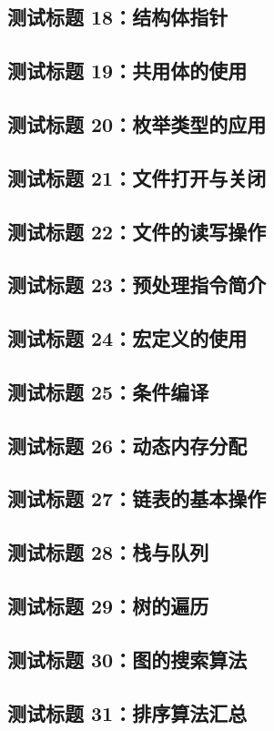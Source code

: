\subsection{测试标题 18：结构体指针}
\subsection{测试标题 19：共用体的使用}
\subsection{测试标题 20：枚举类型的应用}
\subsection{测试标题 21：文件打开与关闭}
\subsection{测试标题 22：文件的读写操作}
\subsection{测试标题 23：预处理指令简介}
\subsection{测试标题 24：宏定义的使用}
\subsection{测试标题 25：条件编译}
\subsection{测试标题 26：动态内存分配}
\subsection{测试标题 27：链表的基本操作}
\subsection{测试标题 28：栈与队列}
\subsection{测试标题 29：树的遍历}
\subsection{测试标题 30：图的搜索算法}
\subsection{测试标题 31：排序算法汇总}
